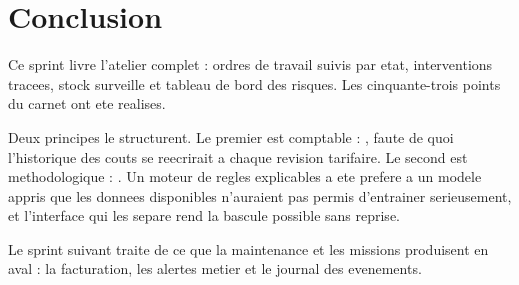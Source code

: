 \section*{Conclusion}

Ce sprint livre l'atelier complet : ordres de travail suivis par etat,
interventions tracees, stock surveille et tableau de bord des risques.
Les cinquante-trois points du carnet ont ete realises.

Deux principes le structurent. Le premier est comptable : , faute de quoi l'historique des
couts se reecrirait a chaque revision tarifaire. Le second est
methodologique : . Un moteur de regles explicables a ete prefere
a un modele appris que les donnees disponibles n'auraient pas permis
d'entrainer serieusement, et l'interface qui les separe rend la bascule
possible sans reprise.

Le sprint suivant traite de ce que la maintenance et les missions
produisent en aval : la facturation, les alertes metier et le journal des
evenements.

